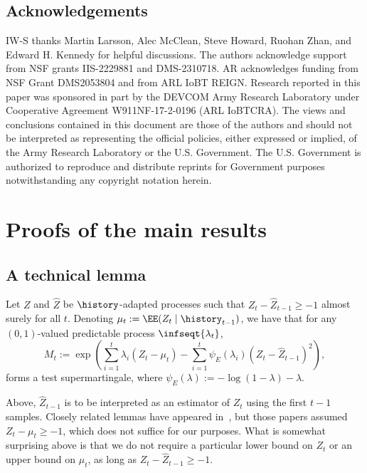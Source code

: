 \subsection*{Acknowledgements}
IW-S thanks Martin Larsson, Alec McClean, Steve Howard, Ruohan Zhan, and Edward H. Kennedy for helpful discussions. The authors acknowledge support from NSF grants IIS-2229881 and DMS-2310718.
AR acknowledges funding from NSF Grant DMS2053804 and from ARL IoBT REIGN. Research reported in this paper was sponsored in part by the DEVCOM Army Research Laboratory under Cooperative Agreement W911NF-17-2-0196 (ARL IoBTCRA). The views and conclusions contained in this document are those of the authors and should not be interpreted as representing the official policies, either expressed or implied, of the Army Research Laboratory or the U.S. Government. The U.S. Government is authorized to reproduce and distribute reprints for Government purposes notwithstanding any copyright notation herein.




\newpage
\appendix

\section{Proofs of the main results}

\subsection{A technical lemma}

\begin{lemma}\label{lemma:bernsm}
Let $Z$ and $\widehat Z$ be $\history$-adapted processes such that $Z_t - \widehat Z_{t-1} \geq -1$ almost surely for all $t$. Denoting $\mu_t := \EE(Z_t \mid \history_{t-1})$, we have that for any $(0, 1)$-valued predictable process $\infseqt{\lambda_t}$, 
\begin{equation}
M_t := \exp\left(\sum_{i=1}^t \lambda_i (Z_t - \mu_t) - \sum_{i=1}^t \psi_E(\lambda_i) \left(Z_t - \widehat Z_{t-1}\right)^2\right),
    \label{eq:ebernsm}
\end{equation}
forms a test supermartingale, where $\psi_E(\lambda) := -\log(1-\lambda) - \lambda$.
\end{lemma}
Above, $\widehat Z_{t-1}$ is to be interpreted as an estimator of $Z_t$ using the first $t-1$ samples. Closely related lemmas have appeared in~\cite{fan2015exponential,howard_exponential_2018,howard2018uniform,waudby2020estimating}, but those papers assumed $Z_t-\mu_t \geq -1$, which does not suffice for our purposes. What is somewhat surprising above is that we do not require a particular lower bound on $Z_t$ or an upper bound on $\mu_t$, as long as $Z_t - \widehat Z_{t-1} \geq -1$.



